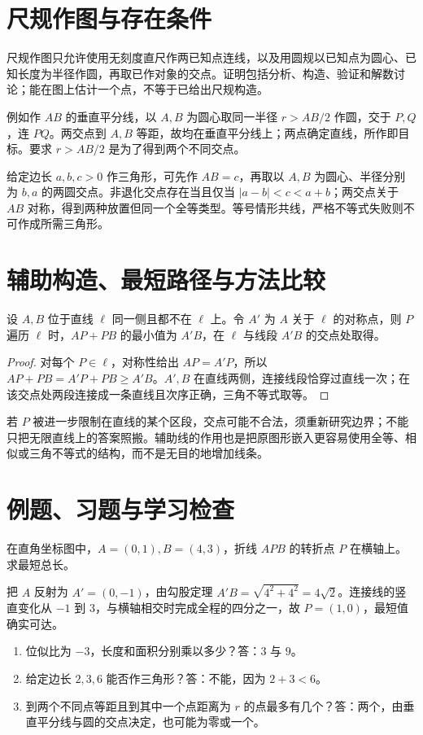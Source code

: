 \documentclass[UTF8]{ctexbook}
\begin{document}
\section{尺规作图与存在条件}
尺规作图只允许使用无刻度直尺作两已知点连线，以及用圆规以已知点为圆心、已知长度为半径作圆，再取已作对象的交点。证明包括分析、构造、验证和解数讨论；能在图上估计一个点，不等于已给出尺规构造。

例如作 $AB$ 的垂直平分线，以 $A,B$ 为圆心取同一半径 $r>AB/2$ 作圆，交于 $P,Q$，连 $PQ$。两交点到 $A,B$ 等距，故均在垂直平分线上；两点确定直线，所作即目标。要求 $r>AB/2$ 是为了得到两个不同交点。

给定边长 $a,b,c>0$ 作三角形，可先作 $AB=c$，再取以 $A,B$ 为圆心、半径分别为 $b,a$ 的两圆交点。非退化交点存在当且仅当 $|a-b|<c<a+b$；两交点关于 $AB$ 对称，得到两种放置但同一个全等类型。等号情形共线，严格不等式失败则不可作成所需三角形。

\section{辅助构造、最短路径与方法比较}
\begin{theorem}[反射求最短折线]
设 $A,B$ 位于直线 $\ell$ 同一侧且都不在 $\ell$ 上。令 $A'$ 为 $A$ 关于 $\ell$ 的对称点，则 $P$ 遍历 $\ell$ 时，$AP+PB$ 的最小值为 $A'B$，在 $\ell$ 与线段 $A'B$ 的交点处取得。
\end{theorem}
\begin{proof}
对每个 $P\in\ell$，对称性给出 $AP=A'P$，所以 $AP+PB=A'P+PB\ge A'B$。$A',B$ 在直线两侧，连接线段恰穿过直线一次；在该交点处两段连接成一条直线且次序正确，三角不等式取等。
\end{proof}
若 $P$ 被进一步限制在直线的某个区段，交点可能不合法，须重新研究边界；不能只把无限直线上的答案照搬。辅助线的作用也是把原图形嵌入更容易使用全等、相似或三角不等式的结构，而不是无目的地增加线条。

\section{例题、习题与学习检查}
\begin{example}
在直角坐标图中，$A=(0,1),B=(4,3)$，折线 $APB$ 的转折点 $P$ 在横轴上。求最短总长。
\end{example}
\begin{solve}
把 $A$ 反射为 $A'=(0,-1)$，由勾股定理 $A'B=\sqrt{4^2+4^2}=4\sqrt2$。连接线的竖直变化从 $-1$ 到 $3$，与横轴相交时完成全程的四分之一，故 $P=(1,0)$，最短值确实可达。
\end{solve}
\begin{enumerate}
\item 位似比为 $-3$，长度和面积分别乘以多少？答：$3$ 与 $9$。
\item 给定边长 $2,3,6$ 能否作三角形？答：不能，因为 $2+3<6$。
\item 到两个不同点等距且到其中一个点距离为 $r$ 的点最多有几个？答：两个，由垂直平分线与圆的交点决定，也可能为零或一个。
\end{enumerate}
\end{document}
